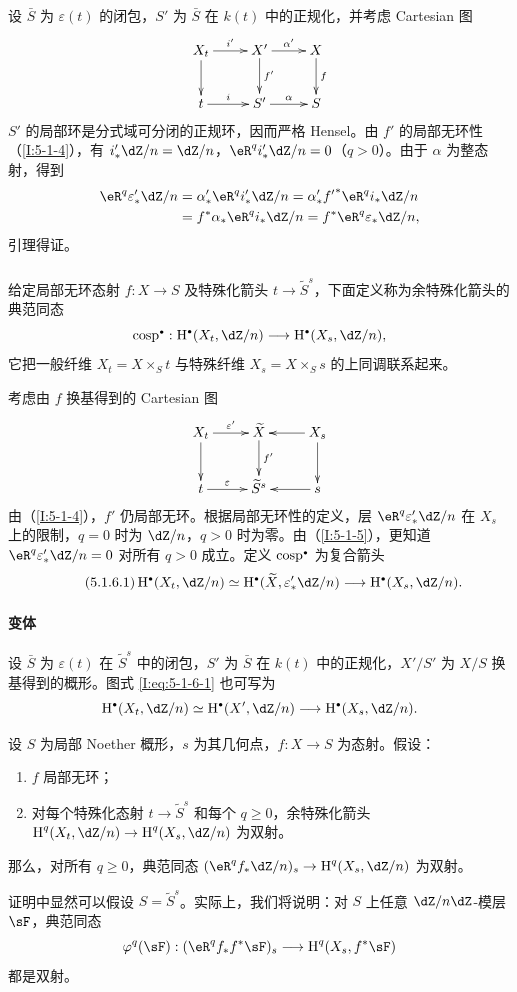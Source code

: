 设 $\bar S$ 为 $\varepsilon(t)$ 的闭包，$S'$ 为 $\bar S$ 在 $k(t)$ 中的正规化，并考虑 Cartesian 图
\[\xymatrix{
X_t\ar[r]^-{i'}\ar[d]&X'\ar[r]^-{\alpha'}\ar[d]^-{f'}&X\ar[d]^-f\\
t\ar[r]^-i&S'\ar[r]^-\alpha&S
}\]
$S'$ 的局部环是分式域可分闭的正规环，因而严格 Hensel。由 $f'$ 的局部无环性（\ref{I:5-1-4}），有 $i'_*\dZ/n=\dZ/n$，$\eR^qi'_*\dZ/n=0$（$q>0$）。由于 $\alpha$ 为整态射，得到
\[
\begin{aligned}
\eR^q\varepsilon'_*\dZ/n
&=\alpha'_*\eR^qi'_*\dZ/n
=\alpha'_*{f'}^*\eR^qi_*\dZ/n\\
&=f^*\alpha_*\eR^qi_*\dZ/n
=f^*\eR^q\varepsilon_*\dZ/n,
\end{aligned}
\]
引理得证。
\subsubsection{}\label{I:5-1-6}
给定局部无环态射 $f:X\to S$ 及特殊化箭头 $t\to\widetilde S^s$，下面定义称为余特殊化箭头的典范同态
\[
\cosp^\bullet:\h^\bullet(X_t,\dZ/n)\longrightarrow\h^\bullet(X_s,\dZ/n),
\]
它把一般纤维 $X_t=X\times_St$ 与特殊纤维 $X_s=X\times_Ss$ 的上同调联系起来。

考虑由 $f$ 换基得到的 Cartesian 图
\[\xymatrix{
X_t\ar[d]\ar[r]^-{\varepsilon'}&\widetilde X\ar[d]^-{f'}&\ar[l]X_s\ar[d]\\
t\ar[r]^-\varepsilon&\widetilde S^s&\ar[l]s
}\]
由（\ref{I:5-1-4}），$f'$ 仍局部无环。根据局部无环性的定义，层 $\eR^q\varepsilon'_*\dZ/n$ 在 $X_s$ 上的限制，$q=0$ 时为 $\dZ/n$，$q>0$ 时为零。由（\ref{I:5-1-5}），更知道 $\eR^q\varepsilon'_*\dZ/n=0$ 对所有 $q>0$ 成立。定义 $\cosp^\bullet$ 为复合箭头
\begin{equation*}\tag{5.1.6.1}\label{I:eq:5-1-6-1}
\h^\bullet(X_t,\dZ/n)\simeq\h^\bullet(\widetilde X,\varepsilon'_*\dZ/n)
\longrightarrow\h^\bullet(X_s,\dZ/n).
\end{equation*}
\paragraph{变体}
设 $\bar S$ 为 $\varepsilon(t)$ 在 $\widetilde S^s$ 中的闭包，$S'$ 为 $\bar S$ 在 $k(t)$ 中的正规化，$X'/S'$ 为 $X/S$ 换基得到的概形。图式 \eqref{I:eq:5-1-6-1} 也可写为
\[
\h^\bullet(X_t,\dZ/n)\simeq\h^\bullet(X',\dZ/n)\longrightarrow\h^\bullet(X_s,\dZ/n).
\]
\begin{theorem}\label{I:5-1-7}
设 $S$ 为局部 Noether 概形，$s$ 为其几何点，$f:X\to S$ 为态射。假设：
\begin{enumerate}[\indent a)]
\item $f$ 局部无环；
\item 对每个特殊化态射 $t\to\widetilde S^s$ 和每个 $q\geqslant0$，余特殊化箭头 $\h^q(X_t,\dZ/n)\to\h^q(X_s,\dZ/n)$ 为双射。
\end{enumerate}
那么，对所有 $q\geqslant0$，典范同态 $(\eR^qf_*\dZ/n)_s\to\h^q(X_s,\dZ/n)$ 为双射。
\end{theorem}
证明中显然可以假设 $S=\widetilde S^s$。实际上，我们将说明：对 $S$ 上任意 $\dZ/n\dZ$-模层 $\sF$，典范同态
\[
\varphi^q(\sF):(\eR^qf_*f^*\sF)_s\longrightarrow\h^q(X_s,f^*\sF)
\]
都是双射。

